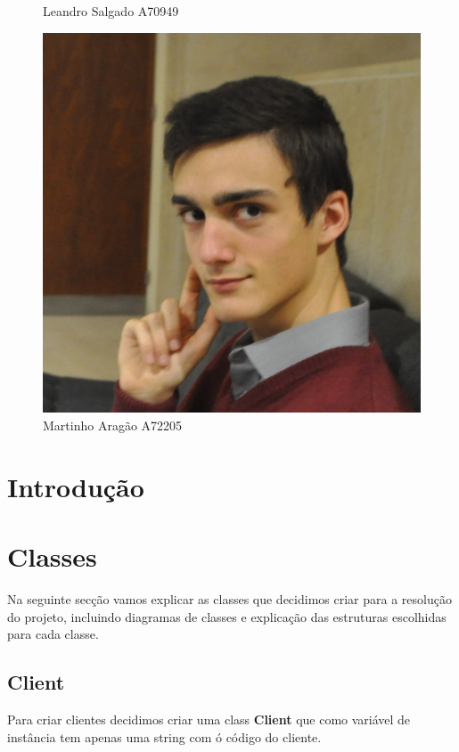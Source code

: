 \documentclass[10pt] {article}
\begin{document}
\begin{figure}[!htb]
  \caption{Leandro Salgado A70949}\label{fig:awesome_image2}
\endminipage\hfill
{}%
  \includegraphics[width=\linewidth]{ma.jpg}
  \caption{Martinho Aragão A72205}
\endminipage
\end{figure}

\newpage

\tableofcontents

\newpage

\section{Introdução}

\newpage
\section{Classes}
Na seguinte secção vamos explicar as classes que decidimos criar para a resolução do projeto, incluindo diagramas 
de classes e explicação das estruturas escolhidas para cada classe.

\subsection{Client}
\par Para criar clientes decidimos criar uma class \textbf{Client} que como variável de instância tem apenas uma string 
com ó código do cliente.
\end{document}
